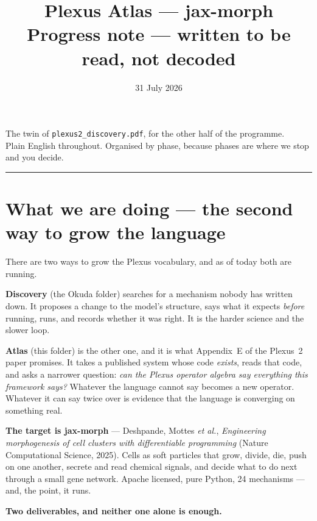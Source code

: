 \documentclass[11pt,a4paper]{article}
\title{\textbf{Plexus Atlas --- jax-morph}\\[6pt]
\large Progress note --- written to be read, not decoded}
\author{}
\date{31 July 2026}
\begin{document}
\maketitle
\vspace{-2.2\baselineskip}

\begin{center}\small\color{grey}
The twin of \texttt{plexus2\_discovery.pdf}, for the other half of the programme.\\
Plain English throughout. Organised by phase, because phases are where we stop and you decide.
\end{center}

\vspace{4pt}
\hrule
\vspace{10pt}

\section{What we are doing --- the second way to grow the language}

There are two ways to grow the Plexus vocabulary, and as of today both are running.

\textbf{Discovery} (the Okuda folder) searches for a mechanism nobody has written down. It
proposes a change to the model's structure, says what it expects \emph{before} running, runs, and
records whether it was right. It is the harder science and the slower loop.

\textbf{Atlas} (this folder) is the other one, and it is what Appendix~E of the Plexus~2 paper
promises. It takes a published system whose code \emph{exists}, reads that code, and asks a
narrower question: \emph{can the Plexus operator algebra say everything this framework says?}
Whatever the language cannot say becomes a new operator. Whatever it can say twice over is
evidence that the language is converging on something real.

\textbf{The target is jax-morph} --- Deshpande, Mottes \emph{et al.}, \emph{Engineering
morphogenesis of cell clusters with differentiable programming} (Nature Computational Science,
2025). Cells as soft particles that grow, divide, die, push on one another, secrete and read
chemical signals, and decide what to do next through a small gene network. Apache licensed, pure
Python, 24 mechanisms --- and, the point, it runs.

\textbf{Two deliverables, and neither one alone is enough.}
\end{document}
